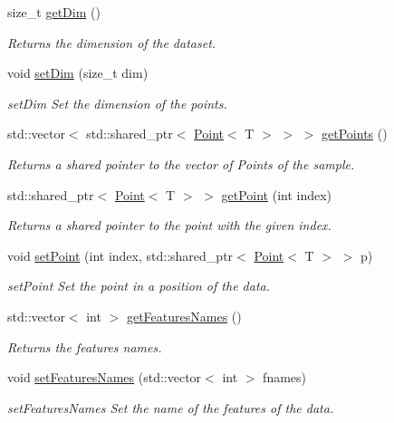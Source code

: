 \begin{DoxyCompactItemize}
size\+\_\+t \mbox{\hyperlink{class_data_a87bdacb790f5a21966308c82b8be44d0}{get\+Dim}} ()
\begin{DoxyCompactList}\small\item\em Returns the dimension of the dataset. \end{DoxyCompactList}\item 
void \mbox{\hyperlink{class_data_ad6e602802e593e4700b3746de55f890b}{set\+Dim}} (size\+\_\+t dim)
\begin{DoxyCompactList}\small\item\em set\+Dim Set the dimension of the points. \end{DoxyCompactList}\item 
std\+::vector$<$ std\+::shared\+\_\+ptr$<$ \mbox{\hyperlink{class_point}{Point}}$<$ T $>$ $>$ $>$ \mbox{\hyperlink{class_data_a63a36fcbe42e0956d602f11af0d2009e}{get\+Points}} ()
\begin{DoxyCompactList}\small\item\em Returns a shared pointer to the vector of Points of the sample. \end{DoxyCompactList}\item 
std\+::shared\+\_\+ptr$<$ \mbox{\hyperlink{class_point}{Point}}$<$ T $>$ $>$ \mbox{\hyperlink{class_data_a482efc1083d4871758ddd05b11bb90ea}{get\+Point}} (int index)
\begin{DoxyCompactList}\small\item\em Returns a shared pointer to the point with the given index. \end{DoxyCompactList}\item 
void \mbox{\hyperlink{class_data_ade1a5caf2f463a894e1d348f728b56cf}{set\+Point}} (int index, std\+::shared\+\_\+ptr$<$ \mbox{\hyperlink{class_point}{Point}}$<$ T $>$ $>$ p)
\begin{DoxyCompactList}\small\item\em set\+Point Set the point in a position of the data. \end{DoxyCompactList}\item 
std\+::vector$<$ int $>$ \mbox{\hyperlink{class_data_a7ca6dfe5013024d75f3e13e42caa96f4}{get\+Features\+Names}} ()
\begin{DoxyCompactList}\small\item\em Returns the features names. \end{DoxyCompactList}\item 
void \mbox{\hyperlink{class_data_a3b22a1e56ab54ca6ecd84bef0ad968cc}{set\+Features\+Names}} (std\+::vector$<$ int $>$ fnames)
\begin{DoxyCompactList}\small\item\em set\+Features\+Names Set the name of the features of the data. \end{DoxyCompactList}\item 

\end{DoxyCompactItemize}
